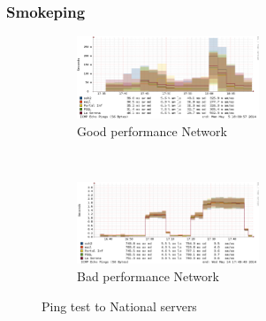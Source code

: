 \begin{frame}
	\frametitle{Smokeping}
	\begin{figure} 
		\begin{subfigure}{\textwidth} 
			\centering 
			\includegraphics[width=0.6\textwidth]{img/smoke_nat_good} 
			\caption[Smokeping: Ping test to National servers with good performance]{Good performance Network} 
		\end{subfigure}%
		\\ 
		\begin{subfigure}{\textwidth} 
			\centering 
			\includegraphics[width=0.6\textwidth]{img/smoke_nat_bad} 
			\caption[Smokeping: Ping test to National servers with bad performance]{Bad performance Network} 
		\end{subfigure} 
		\caption{Ping test to National servers} 
	\end{figure} 
\end{frame}



